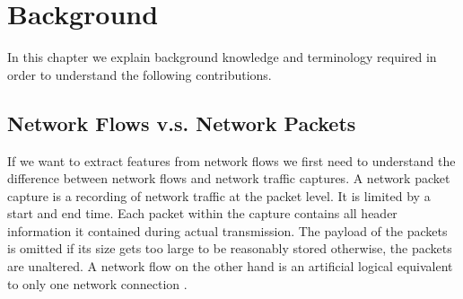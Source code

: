 \documentclass[
	ngerman,
	ruledheaders=section,%
	class=report,%
	thesis={type=bachelor},%
	accentcolor=9c,%
	custommargins=true,%
	marginpar=false,%
	parskip=half-,%
	fontsize=11pt,%
]{tudapub}
\begin{document}
\chapter{Background}
\label{sec:background}

In this chapter we explain background knowledge and terminology required in order to understand the following contributions.


%
%

\section{Network Flows v.s. Network Packets}
\label{sec:flowvspackets}

If we want to extract features from network flows
we first need to understand the difference between network flows and network traffic captures.
A network packet capture is a recording of network traffic at the packet level.
It is limited by a start and end time.
Each packet within the capture contains all header information it contained during actual transmission.
The payload of the packets is omitted if its size gets too large to be reasonably stored otherwise, the packets are unaltered.
A network flow on the other hand is an artificial logical equivalent to only one network connection \cite{brownleeTrafficFlowMeasurement}.
\end{document}
